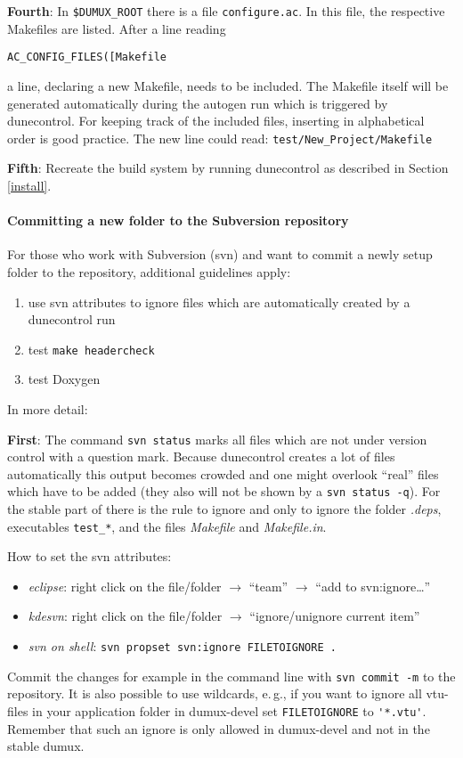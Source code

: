 \textbf{Fourth}: In \verb+$DUMUX_ROOT+ there is a file \verb+configure.ac+. In this file, the respective Makefiles are listed. After a line reading

 \verb+AC_CONFIG_FILES([Makefile+ 

 \noindent a line, declaring a new Makefile, needs to be included. The Makefile itself will be generated automatically during the autogen run which is triggered by dunecontrol. For keeping track of the included files, inserting in alphabetical order is good practice. The new line could read: \verb+test/New_Project/Makefile+ 

\textbf{Fifth}: Recreate the build system by running dunecontrol as described in Section \ref{install}.

\paragraph{Committing a new folder to the Subversion repository}
For those who work with Subversion (svn) and want to commit a newly setup folder to the repository, additional guidelines apply:

\begin{enumerate}[1)]
 \item use svn attributes to ignore files which are automatically created by a dunecontrol run
 \item test \texttt{make headercheck}
 \item test Doxygen
\end{enumerate}

\noindent In more detail:

\textbf{First}: The command \verb+svn status+ marks all files which are not under version control with a question mark. Because dunecontrol creates a lot of files automatically this output becomes crowded and one might overlook ``real'' files which have to be added (they also will not be shown by a \verb+svn status -q+).
For the stable part of \Dumux there is the rule to ignore and only to ignore the folder {\em .deps}, executables \texttt{test\_*}, and the files {\em Makefile} and {\em Makefile.in}.

How to set the svn attributes:
\begin{itemize}
 \item{\em eclipse}: right click on the file/folder $\rightarrow$ ``team'' $\rightarrow$ ``add to svn:ignore\dots''
 \item{\em kdesvn}: right click on the file/folder $\rightarrow$ ``ignore/unignore current item''
 \item{\em svn on shell}: \verb+svn propset svn:ignore FILETOIGNORE .+
\end{itemize}
Commit the changes for example in the command line with \verb+svn commit -m+ to the repository. It is also possible to use wildcards, e.\,g., if you want to ignore all vtu-files in your application folder in dumux-devel set \verb+FILETOIGNORE+ to \verb+'*.vtu'+. Remember that such an ignore is only allowed in dumux-devel and not in the stable dumux.

